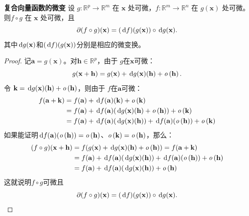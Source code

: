 \documentclass[12pt,UTF8,fontset=none]{ctexbook}
\begin{document}
\begin{appendix}
\begin{tm}{\textbf{复合向量函数的微变}}
    设 $g:\mathbb{R}^p\to\mathbb{R}^m$ 在 $\mathbf{x}$ 处可微，$f:\mathbb{R}^m\to\mathbb{R}^n$ 在 $g(\mathbf{x})$ 处可微。则$f\circ g$ 在 $\mathbf{x}$ 处可微，且
    $$ \partial (f \circ g) (\mathbf{x}) = (\,\mathrm{d} f)(g(\mathbf{x}))\circ \,\mathrm{d} g(\mathbf{x}). $$
    其中$\,\mathrm{d} g(\mathbf{x})$和$(\,\mathrm{d} f)(g(\mathbf{x}))$分别是相应的微变换。
\end{tm}
\begin{proof}
    记$\mathbf{a}=g(\mathbf{x})$。对$\mathbf{h}\in\mathbb{R}^p$，由于 $g$在$\mathbf{x}$可微：
    $$ g(\mathbf{x}+\mathbf{h}) = g(\mathbf{x}) + \,\mathrm{d} g(\mathbf{x})(\mathbf{h}) + \mathit{o}\left(\mathbf{h}\right).$$
    令 $\mathbf{k} = \,\mathrm{d} g(\mathbf{x})(\mathbf{h}) + \mathit{o}\left(\mathbf{h}\right)$，则由于 $f$在$\mathbf{a}$可微：
    \begin{align*}
        f(\mathbf{a}+\mathbf{k}) &= f(\mathbf{a}) + \,\mathrm{d} f(\mathbf{a})(\mathbf{k}) + \mathit{o}\left(\mathbf{k}\right)\\
         &= f(\mathbf{a}) + \,\mathrm{d} f(\mathbf{a})(\,\mathrm{d} g(\mathbf{x})(\mathbf{h}) + \mathit{o}\left(\mathbf{h}\right)) + \mathit{o}\left(\mathbf{k}\right) \\
         &= f(\mathbf{a}) + \,\mathrm{d} f(\mathbf{a})(\,\mathrm{d} g(\mathbf{x})(\mathbf{h})) + \,\mathrm{d} f(\mathbf{a})(\mathit{o}\left(\mathbf{h}\right)) + \mathit{o}\left(\mathbf{k}\right) 
    \end{align*}
    如果能证明$\,\mathrm{d} f(\mathbf{a})(\mathit{o}\left(\mathbf{h}\right)) = \mathit{o}\left(\mathbf{h}\right)$、$\mathit{o}\left(\mathbf{k}\right)= \mathit{o}\left(\mathbf{h}\right)$，那么：
    \begin{align*}
        (f\circ g)(\mathbf{x}+\mathbf{h}) &= f(g(\mathbf{x}) + \,\mathrm{d} g(\mathbf{x})(\mathbf{h}) + \mathit{o}\left(\mathbf{h}\right)) = f(\mathbf{a}+\mathbf{k})\\
         &= f(\mathbf{a}) + \,\mathrm{d} f(\mathbf{a})(\,\mathrm{d} g(\mathbf{x})(\mathbf{h})) + \,\mathrm{d} f(\mathbf{a})(\mathit{o}\left(\mathbf{h}\right)) + \mathit{o}\left(\mathbf{h}\right) \\
        &= f(\mathbf{a}) + \,\mathrm{d} f(\mathbf{a})(\,\mathrm{d} g(\mathbf{x})(\mathbf{h})) + \mathit{o}\left(\mathbf{h}\right)
    \end{align*}
    这就说明$f\circ g$可微且
    $$ \partial (f \circ g) (\mathbf{x}) = (\,\mathrm{d} f)(g(\mathbf{x}))\circ \,\mathrm{d} g(\mathbf{x}). $$
    

\end{proof}
\end{appendix}
\end{document}
